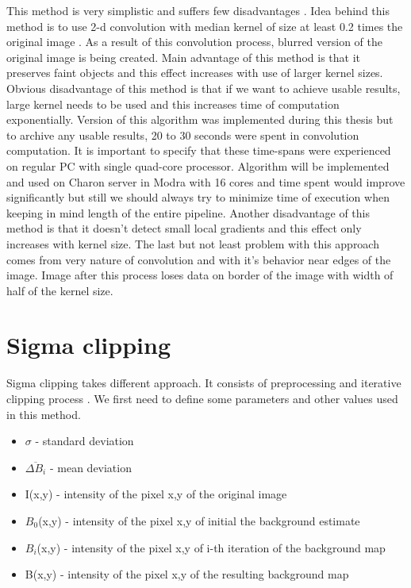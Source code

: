 \documentclass[12pt, a4paper, oneside]{book}
\begin{document}
This method is very simplistic and suffers few disadvantages \cite{stovaken}.
Idea behind this method is to use 2-d convolution with median kernel of size at least 0.2 times the original image \cite{median_filtering}.
As a result of this convolution process, blurred version of the original image is being created.
Main advantage of this method is that it preserves faint objects and this effect increases with use of larger kernel sizes.
Obvious disadvantage of this method is that if we want to achieve usable results, large kernel needs to be used and this increases time of computation exponentially.
Version of this algorithm was implemented during this thesis but to archive any usable results, 20 to 30 seconds were spent in convolution computation.
It is important to specify that these time-spans were experienced on regular PC with single quad-core processor.
Algorithm will be implemented and used on Charon server in Modra with 16 cores and time spent would improve significantly but still we should always try to minimize time of execution when keeping in mind length of the entire pipeline.
Another disadvantage of this method is that it doesn't detect small local gradients and this effect only increases with kernel size.
The last but not least problem with this approach comes from very nature of convolution and with it's behavior near edges of the image.
Image after this process loses data on border of the image with width of half of the kernel size.

\section{Sigma clipping}

Sigma clipping takes different approach.
It consists of preprocessing and iterative clipping process \cite{kouprianov}.
We first need to define some parameters and other values used in this method.
\begin{itemize}
    \item{$\sigma$ - standard deviation}
    \item{$\overline{\Delta B_i}$ - mean deviation}
    \item{I(x,y) - intensity of the pixel x,y of the original image}
    \item{$B_0$(x,y) - intensity of the pixel x,y of initial the background estimate}
    \item{$B_i$(x,y) - intensity of the pixel x,y of i-th iteration of the background map}
    \item{B(x,y) - intensity of the pixel x,y of the resulting background map}
\end{itemize}
\end{document}
